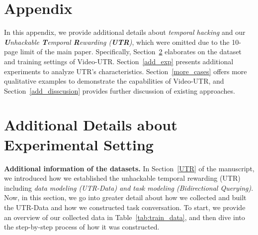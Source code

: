 \section{Appendix}
\label{appendix}

In this appendix, we provide additional details about \textit{temporal hacking} and our \textit{\textbf{U}nhackable \textbf{T}emporal \textbf{R}ewarding (\textbf{UTR})}, which were omitted due to the 10-page limit of the main paper. Specifically, Section~\ref{exp_detail} elaborates on the dataset and training settings of Video-UTR. Section~\ref{add_exp} presents additional experiments to analyze UTR’s characteristics. Section~\ref{more_cases} offers more qualitative examples to demonstrate the capabilities of Video-UTR, and Section~\ref{add_disscusion} provides further discussion of existing approaches.


\section{Additional Details about Experimental Setting}
\label{exp_detail}

\textbf{Additional information of the datasets.} In Section~\ref{UTR} of the manuscript, we introduced how we established the unhackable temporal rewarding (UTR) including \textit{data modeling (UTR-Data) and \textit{task modeling (Bidirectional Querying)}}. Now, in this section, we go into greater detail about how we collected and built the UTR-Data and how we constructed task conversation. To start, we provide an overview of our collected data in Table~\ref{tab:train_data}, and then dive into the step-by-step process of how it was constructed.

